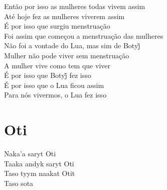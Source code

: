 \bigskip

\begin{linenumbers}\begingroup\raggedright
\noindent Então por isso as mulheres todas vivem assim\\
Até hoje fez as mulheres viverem assim\\
É por isso que surgiu menstruação\\
Foi assim que começou a menstruação das mulheres\\
Não foi a vontade do Lua, mas sim de Botyj̃\\
Mulher não pode viver sem menstruação\\
A mulher vive como tem que viver\\
É por isso que Botyj̃ fez isso\\
É por isso que o Lua ficou assim\\
Para nós vivermos, o Lua fez isso
\end{linenumbers}\endgroup

\chapter*{Oti}

\begin{linenumbers}\begingroup\raggedright
 \noindent Naka'a saryt Oti\\
 Taaka andyk saryt Oti\\
 Taso tyym naakat Otit\\
 Taso sota

\end{linenumbers}\endgroup

